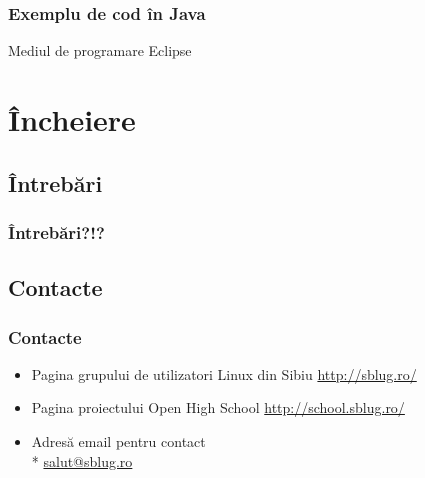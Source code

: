 \documentclass[compress]{beamer}
\begin{document}
\begin{frame}
\frametitle{Exemplu de cod \^{i}n Java}

\begin{alertblock}{Mediul de programare Eclipse}

\end{alertblock}

\end{frame} 

\section{\^{I}ncheiere}
\subsection{\^{I}ntreb\u{a}ri}

\begin{frame}
\frametitle{\^{I}ntreb\u{a}ri?!?}

\end{frame} 

\subsection{Contacte}

\begin{frame}
\frametitle{Contacte}

\begin{itemize}
    \item Pagina grupului de utilizatori Linux din Sibiu \url{http://sblug.ro/}
    \item Pagina proiectului Open High School \url{http://school.sblug.ro/}
    \item Adres\u{a} email pentru contact \\* \href{mailto:salut@sblug.ro}{salut@sblug.ro}
\end{itemize}

\end{frame} 
\end{document}
